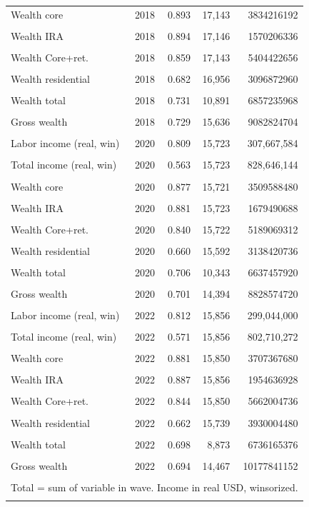 \begin{table}[htbp]
\begin{tabular}{llrrr}
Wealth core & 2018 & 0.893 & 17,143 & 3834216192 \\\\
Wealth IRA & 2018 & 0.894 & 17,146 & 1570206336 \\\\
Wealth Core+ret. & 2018 & 0.859 & 17,143 & 5404422656 \\\\
Wealth residential & 2018 & 0.682 & 16,956 & 3096872960 \\\\
Wealth total & 2018 & 0.731 & 10,891 & 6857235968 \\\\
Gross wealth & 2018 & 0.729 & 15,636 & 9082824704 \\\\
Labor income (real, win) & 2020 & 0.809 & 15,723 & 307,667,584 \\\\
Total income (real, win) & 2020 & 0.563 & 15,723 & 828,646,144 \\\\
Wealth core & 2020 & 0.877 & 15,721 & 3509588480 \\\\
Wealth IRA & 2020 & 0.881 & 15,723 & 1679490688 \\\\
Wealth Core+ret. & 2020 & 0.840 & 15,722 & 5189069312 \\\\
Wealth residential & 2020 & 0.660 & 15,592 & 3138420736 \\\\
Wealth total & 2020 & 0.706 & 10,343 & 6637457920 \\\\
Gross wealth & 2020 & 0.701 & 14,394 & 8828574720 \\\\
Labor income (real, win) & 2022 & 0.812 & 15,856 & 299,044,000 \\\\
Total income (real, win) & 2022 & 0.571 & 15,856 & 802,710,272 \\\\
Wealth core & 2022 & 0.881 & 15,850 & 3707367680 \\\\
Wealth IRA & 2022 & 0.887 & 15,856 & 1954636928 \\\\
Wealth Core+ret. & 2022 & 0.844 & 15,850 & 5662004736 \\\\
Wealth residential & 2022 & 0.662 & 15,739 & 3930004480 \\\\
Wealth total & 2022 & 0.698 & 8,873 & 6736165376 \\\\
Gross wealth & 2022 & 0.694 & 14,467 & 10177841152 \\\\
\bottomrule
\multicolumn{5}{l}{\footnotesize Total = sum of variable in wave. Income in real USD, winsorized.} \\\\
\end{tabular}
\end{table}
